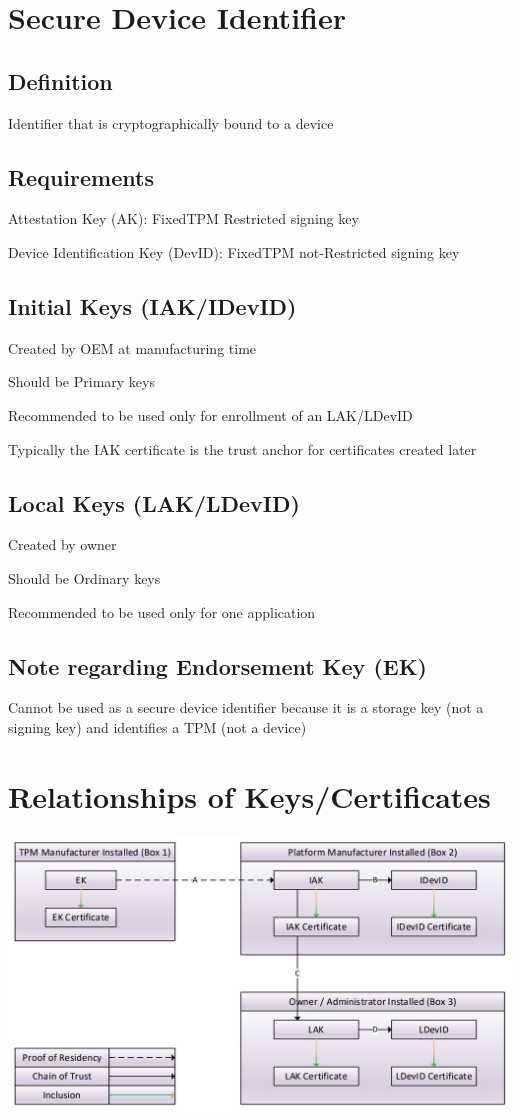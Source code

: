 \documentclass{article}
\begin{document}
\section*{Secure Device Identifier}
\subsection*{Definition}
Identifier that is cryptographically bound to a device

\subsection*{Requirements}
Attestation Key (AK): FixedTPM Restricted signing key

Device Identification Key (DevID): FixedTPM not-Restricted signing key

\subsection*{Initial Keys (IAK/IDevID)}
Created by OEM at manufacturing time

Should be Primary keys

Recommended to be used only for enrollment of an LAK/LDevID

Typically the IAK certificate is the trust anchor for certificates created later

\subsection*{Local Keys (LAK/LDevID)}
Created by owner

Should be Ordinary keys

Recommended to be used only for one application

\subsection*{Note regarding Endorsement Key (EK)}
Cannot be used as a secure device identifier because it is a storage key (not a signing key) and identifies a TPM (not a device)

\section*{Relationships of Keys/Certificates}
\includegraphics[scale=0.6]{certificateRelationships.jpg}
\end{document}
